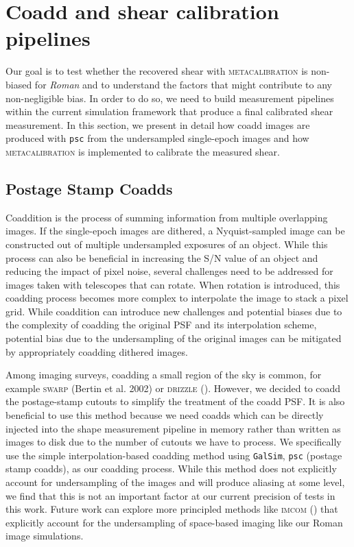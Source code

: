 \documentclass[fleqn,usenatbib]{mnras}
\begin{document}
\section{Coadd and shear calibration pipelines}
\label{sec:methods}
Our goal is to test whether the recovered shear with \textsc{metacalibration} is non-biased for \emph{Roman} and to understand the factors that might contribute to any non-negligible bias. In order to do so, we need to build measurement pipelines within the current simulation framework that produce a final calibrated shear measurement. In this section, we present in detail how coadd images are produced with \texttt{psc} from the undersampled single-epoch images and how \textsc{metacalibration} is implemented to calibrate the measured shear. 


\subsection{Postage Stamp Coadds}
\label{subsec:psc}
Coaddition is the process of summing information from multiple overlapping images. If the single-epoch images are dithered, a Nyquist-sampled image can be constructed out of multiple undersampled exposures of an object. While this process can also be beneficial in increasing the S/N value of an object and reducing the impact of pixel noise, several challenges need to be addressed for images taken with telescopes that can rotate. When rotation is introduced, this coadding process becomes more complex to interpolate the image to stack a pixel grid. While coaddition can introduce new challenges and potential biases due to the complexity of coadding the original PSF and its interpolation scheme, potential bias due to the undersampling of the original images can be mitigated by appropriately coadding dithered images. 

Among imaging surveys, coadding a small region of the sky is common, for example \textsc{swarp} (Bertin et al. 2002) or \textsc{drizzle} (\citealt{2002PASP..114..144F}). However, we decided to coadd the postage-stamp cutouts to simplify the treatment of the coadd PSF. It is also beneficial to use this method because we need coadds which can be directly injected into the shape measurement pipeline in memory rather than written as images to disk due to the number of cutouts we have to process. We specifically use the simple interpolation-based coadding method using \texttt{GalSim}, \texttt{psc} (postage stamp coadds), as our coadding process.
While this method does not explicitly account for undersampling of the images and will produce aliasing at some level, we find that this is not an important factor at our current precision of tests in this work. Future work can explore more principled methods like \textsc{imcom} (\citealt{2011ApJ...741...46R}) that explicitly account for the undersampling of space-based imaging like our Roman image simulations.
\end{document}
